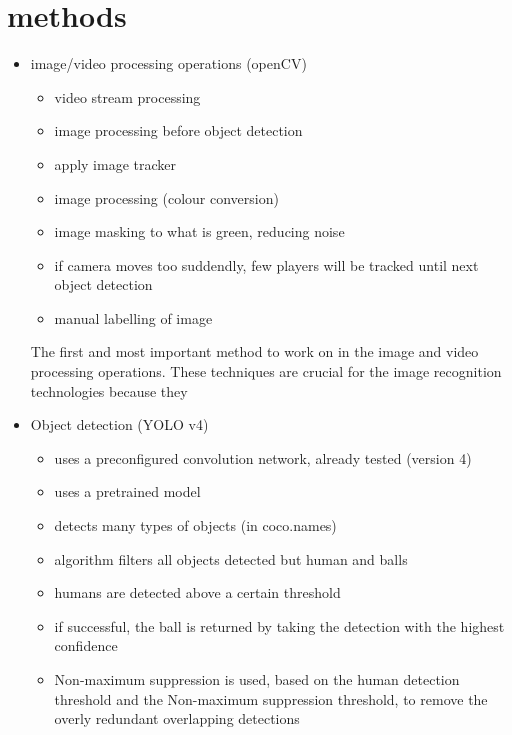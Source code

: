 \documentclass[
11pt,
twoside
]{report}
\begin{document}
\section{methods}

\begin{itemize}
\item
  image/video processing operations (openCV)

  \begin{itemize}
      \item
        video stream processing
      \item
        image processing before object detection
      \item
        apply image tracker
      \item
        image processing (colour conversion)
      \item
        image masking to what is green, reducing noise
      \item
        if camera moves too suddendly, few players will be tracked until next object detection
      \item
        manual labelling of image
  \end{itemize}


The first and most important method to work on in the image and video processing operations. These techniques are crucial for the image recognition technologies because they

\item
  Object detection (YOLO v4)

  \begin{itemize}
  \item
    uses a preconfigured convolution network, already tested (version 4)
  \item
    uses a pretrained model
  \item
    detects many types of objects (in coco.names)
  \item
    algorithm filters all objects detected but human and balls
  \item
    humans are detected above a certain threshold
  \item
    if successful, the ball is returned by taking the detection with the
    highest confidence
  \item
    Non-maximum suppression is used, based on the human detection
    threshold and the Non-maximum suppression threshold, to remove the
    overly redundant overlapping detections
  \end{itemize}



\end{itemize}
\end{document}
